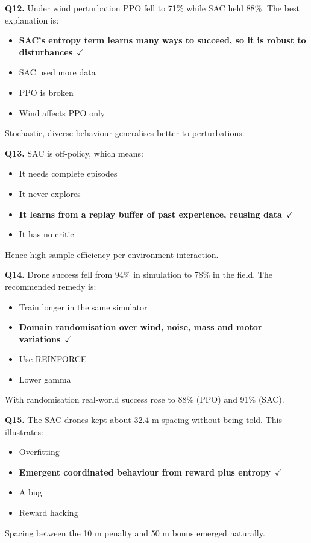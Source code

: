 \documentclass[11pt]{article}
\begin{document}
{\noindent\textbf{Q12.} Under wind perturbation PPO fell to 71\% while SAC held 88\%. The best explanation is:\begin{itemize}[leftmargin=2.2em,itemsep=0pt,topsep=1pt]\item[\textbf{A.}] \textbf{SAC's entropy term learns many ways to succeed, so it is robust to disturbances}~{\color{GrnN}$\checkmark$}\item[B.] SAC used more data\item[C.] PPO is broken\item[D.] Wind affects PPO only\end{itemize} Stochastic, diverse behaviour generalises better to perturbations.\par\medskip

\noindent\textbf{Q13.} SAC is off-policy, which means:\begin{itemize}[leftmargin=2.2em,itemsep=0pt,topsep=1pt]\item[A.] It needs complete episodes\item[B.] It never explores\item[\textbf{C.}] \textbf{It learns from a replay buffer of past experience, reusing data}~{\color{GrnN}$\checkmark$}\item[D.] It has no critic\end{itemize} Hence high sample efficiency per environment interaction.\par\medskip

\noindent\textbf{Q14.} Drone success fell from 94\% in simulation to 78\% in the field. The recommended remedy is:\begin{itemize}[leftmargin=2.2em,itemsep=0pt,topsep=1pt]\item[A.] Train longer in the same simulator\item[\textbf{B.}] \textbf{Domain randomisation over wind, noise, mass and motor variations}~{\color{GrnN}$\checkmark$}\item[C.] Use REINFORCE\item[D.] Lower gamma\end{itemize} With randomisation real-world success rose to 88\% (PPO) and 91\% (SAC).\par\medskip

\noindent\textbf{Q15.} The SAC drones kept about 32.4 m spacing without being told. This illustrates:\begin{itemize}[leftmargin=2.2em,itemsep=0pt,topsep=1pt]\item[A.] Overfitting\item[\textbf{B.}] \textbf{Emergent coordinated behaviour from reward plus entropy}~{\color{GrnN}$\checkmark$}\item[C.] A bug\item[D.] Reward hacking\end{itemize} Spacing between the 10 m penalty and 50 m bonus emerged naturally.\par\medskip

}
\end{document}
